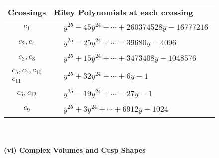 \documentclass[1p]{elsarticle_modified}
\theoremstyle{definition}
\begin{document}
\begin{tabular}{m{50pt}|m{274pt}}
Crossings & \hspace{64pt}Riley Polynomials at each crossing \\
\hline $$\begin{aligned}c_{1}\end{aligned}$$&$\begin{aligned}
&y^{25}-45 y^{24}+\cdots+260374528 y-16777216
\end{aligned}$\\
\hline $$\begin{aligned}c_{2},c_{4}\end{aligned}$$&$\begin{aligned}
&y^{25}-25 y^{24}+\cdots-39680 y-4096
\end{aligned}$\\
\hline $$\begin{aligned}c_{3},c_{8}\end{aligned}$$&$\begin{aligned}
&y^{25}+15 y^{24}+\cdots+3473408 y-1048576
\end{aligned}$\\
\hline $$\begin{aligned}c_{5},c_{7},c_{10}\\c_{11}\end{aligned}$$&$\begin{aligned}
&y^{25}+32 y^{24}+\cdots+6 y-1
\end{aligned}$\\
\hline $$\begin{aligned}c_{6},c_{12}\end{aligned}$$&$\begin{aligned}
&y^{25}-19 y^{24}+\cdots-27 y-1
\end{aligned}$\\
\hline $$\begin{aligned}c_{9}\end{aligned}$$&$\begin{aligned}
&y^{25}+3 y^{24}+\cdots+6912 y-1024
\end{aligned}$\\
\hline
\end{tabular}\\~\\
\newpage\flushleft \textbf{(vi) Complex Volumes and Cusp Shapes}
\end{document}
